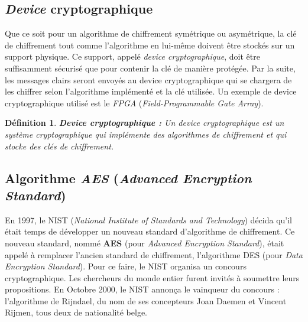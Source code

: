 \documentclass[oneside]{book}
\newtheorem{definition}{Définition}[section]
\begin{document}
\subsection{\textit{Device} cryptographique}
\label{sec:Introduction}

Que ce soit pour un algorithme de chiffrement symétrique ou asymétrique, la clé de chiffrement tout comme l'algorithme en lui-même doivent être stockés sur un support physique. Ce support, appelé \textit{device cryptographique}, doit être suffisamment sécurisé que pour contenir la clé de manière protégée. Par la suite, les messages clairs seront envoyés au device cryptographique qui se chargera de les chiffrer selon l'algorithme implémenté et la clé utilisée. Un exemple de device cryptographique utilisé est le \textit{FPGA} (\textit{Field-Programmable Gate Array}).

\theoremstyle{definition}
\begin{definition}{\textbf{Device cryptographique :}}
Un device cryptographique est un système cryptographique qui implémente des algorithmes de chiffrement et qui stocke des clés de chiffrement.
\end{definition}
\label{def:device}

\newpage

\subsection{Algorithme \textit{AES} (\textit{Advanced Encryption Standard})}
\label{subsec:AES}

En 1997, le NIST (\textit{National Institute of Standards and Technology}) décida qu'il était temps de développer un nouveau standard d'algorithme de chiffrement. Ce nouveau standard, nommé \textbf{AES} (pour \textit{Advanced Encryption Standard}), était appelé à remplacer l'ancien standard de chiffrement, l'algorithme DES (pour \textit{Data Encryption Standard}). Pour ce faire, le NIST organisa un concours cryptographique. Les chercheurs du monde entier furent invités à soumettre leurs propositions. En Octobre 2000, le NIST annonça le vainqueur du concours : l'algorithme de Rijndael, du nom de ses concepteurs Joan Daemen et Vincent Rijmen, tous deux de nationalité belge.
\end{document}
